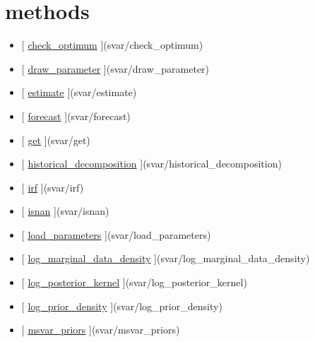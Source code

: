 \documentclass[letterpaper,10pt,english]{sphinxmanual}
\begin{document}
\section{methods}
\label{classes/models/@svar/svar:methods}\begin{itemize}
\item {} 
{[} {\hyperref[classes/models/@svar/svar:check-optimum]{check\_optimum}} {]}(svar/check\_optimum)

\item {} 
{[} {\hyperref[classes/models/@svar/svar:draw-parameter]{draw\_parameter}} {]}(svar/draw\_parameter)

\item {} 
{[} {\hyperref[classes/models/@svar/svar:estimate]{estimate}} {]}(svar/estimate)

\item {} 
{[} {\hyperref[classes/models/@svar/svar:forecast]{forecast}} {]}(svar/forecast)

\item {} 
{[} {\hyperref[classes/models/@svar/svar:get]{get}} {]}(svar/get)

\item {} 
{[} {\hyperref[classes/models/@svar/svar:historical-decomposition]{historical\_decomposition}} {]}(svar/historical\_decomposition)

\item {} 
{[} {\hyperref[classes/models/@svar/svar:irf]{irf}} {]}(svar/irf)

\item {} 
{[} {\hyperref[classes/models/@svar/svar:isnan]{isnan}} {]}(svar/isnan)

\item {} 
{[} {\hyperref[classes/models/@svar/svar:load-parameters]{load\_parameters}} {]}(svar/load\_parameters)

\item {} 
{[} {\hyperref[classes/models/@svar/svar:log-marginal-data-density]{log\_marginal\_data\_density}} {]}(svar/log\_marginal\_data\_density)

\item {} 
{[} {\hyperref[classes/models/@svar/svar:log-posterior-kernel]{log\_posterior\_kernel}} {]}(svar/log\_posterior\_kernel)

\item {} 
{[} {\hyperref[classes/models/@svar/svar:log-prior-density]{log\_prior\_density}} {]}(svar/log\_prior\_density)

\item {} 
{[} {\hyperref[classes/models/@svar/svar:msvar-priors]{msvar\_priors}} {]}(svar/msvar\_priors)


\end{itemize}
\end{document}
